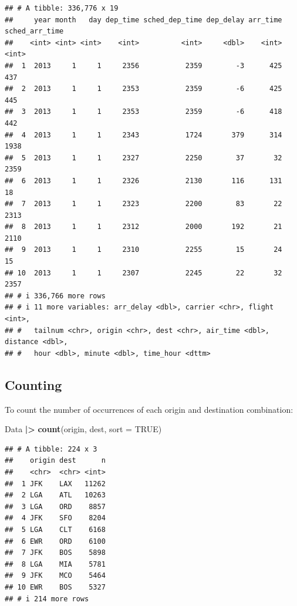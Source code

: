 \documentclass[
]{book}
\newenvironment{Shaded}{\begin{snugshade}}{\end{snugshade}}
\newcommand{\AttributeTok}[1]{\textcolor[rgb]{0.13,0.29,0.53}{#1}}
\newcommand{\ConstantTok}[1]{\textcolor[rgb]{0.56,0.35,0.01}{#1}}
\newcommand{\FunctionTok}[1]{\textcolor[rgb]{0.13,0.29,0.53}{\textbf{#1}}}
\newcommand{\NormalTok}[1]{#1}
\newcommand{\SpecialCharTok}[1]{\textcolor[rgb]{0.81,0.36,0.00}{\textbf{#1}}}
\theoremstyle{definition}
\theoremstyle{definition}
\theoremstyle{definition}
\theoremstyle{definition}
\theoremstyle{remark}
\begin{document}
\begin{verbatim}
## # A tibble: 336,776 x 19
##     year month   day dep_time sched_dep_time dep_delay arr_time sched_arr_time
##    <int> <int> <int>    <int>          <int>     <dbl>    <int>          <int>
##  1  2013     1     1     2356           2359        -3      425            437
##  2  2013     1     1     2353           2359        -6      425            445
##  3  2013     1     1     2353           2359        -6      418            442
##  4  2013     1     1     2343           1724       379      314           1938
##  5  2013     1     1     2327           2250        37       32           2359
##  6  2013     1     1     2326           2130       116      131             18
##  7  2013     1     1     2323           2200        83       22           2313
##  8  2013     1     1     2312           2000       192       21           2110
##  9  2013     1     1     2310           2255        15       24             15
## 10  2013     1     1     2307           2245        22       32           2357
## # i 336,766 more rows
## # i 11 more variables: arr_delay <dbl>, carrier <chr>, flight <int>,
## #   tailnum <chr>, origin <chr>, dest <chr>, air_time <dbl>, distance <dbl>,
## #   hour <dbl>, minute <dbl>, time_hour <dttm>
\end{verbatim}

\hypertarget{counting}{%
\subsection{Counting}\label{counting}}

To count the number of occurrences of each origin and destination combination:

\begin{Shaded}
\begin{Highlighting}[]
\NormalTok{Data }\SpecialCharTok{|\textgreater{}}
  \FunctionTok{count}\NormalTok{(origin, dest, }\AttributeTok{sort =} \ConstantTok{TRUE}\NormalTok{)}
\end{Highlighting}
\end{Shaded}

\begin{verbatim}
## # A tibble: 224 x 3
##    origin dest      n
##    <chr>  <chr> <int>
##  1 JFK    LAX   11262
##  2 LGA    ATL   10263
##  3 LGA    ORD    8857
##  4 JFK    SFO    8204
##  5 LGA    CLT    6168
##  6 EWR    ORD    6100
##  7 JFK    BOS    5898
##  8 LGA    MIA    5781
##  9 JFK    MCO    5464
## 10 EWR    BOS    5327
## # i 214 more rows
\end{verbatim}
\end{document}
